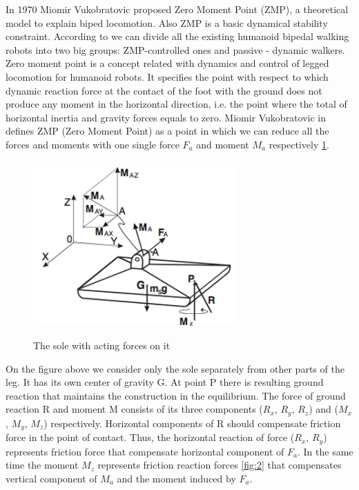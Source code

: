 \documentclass[12pt,a4paper]{report}
\begin{document}
		In 1970 Miomir Vukobratovic proposed Zero Moment Point (ZMP), a theoretical model to explain biped locomotion. Also ZMP is a basic dynamical stability constraint.
		According to \cite{manchester2011stable} we can divide all the existing humanoid bipedal walking robots into two big groups: ZMP-controlled ones and passive - dynamic walkers.\\
		Zero moment point is a concept related with dynamics and control of legged locomotion for humanoid robots. It specifies the point with respect to which dynamic reaction force at the contact of the foot with the ground does not produce any moment in the horizontal direction, i.e. the point where the total of horizontal inertia and gravity forces equals to zero.
		Miomir Vukobratovic in \cite{vukobratovic2004zero} defines ZMP (Zero Moment Point) as a point in which we can reduce all the forces and moments with one single force $F_a$ and moment $M_a$ respectively  \cref{fig:1}.
	
		\begin{figure}[h!]
			\vspace{-0.2cm}
			\centering
			{\includegraphics[width=0.7\textwidth]{1}}
			\caption{The sole with acting forces on it}
			\label{fig:1}
			\vspace{-0.1cm}
		\end{figure}

		On the figure above we consider only the sole separately from other parts of the leg. It has its own center of gravity G. At point P there is resulting ground reaction that maintains the construction in the equilibrium. The force of ground reaction R and moment M consists of its three components ($R_x$, $R_y$, $R_z$) and ($M_x$, $M_y$, $M_z$) respectively. Horizontal components of R should compensate friction force in the point of contact. Thus, the horizontal reaction of force ($R_x$, $R_y$) represents 
		friction force that compensate horizontal component of $F_a$. In the same time the moment $M_z$ represents friction reaction forces \cref{fig:2} that compensates vertical component of $M_a$ and the moment induced by $F_a$. \cite{vukobratovic2004zero}
\end{document}
